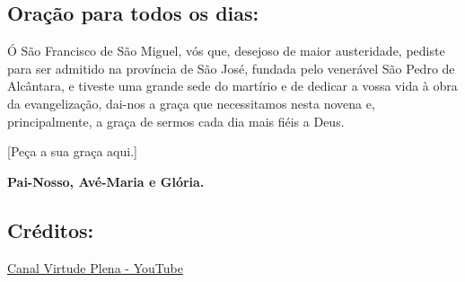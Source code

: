 \documentclass[11pt]{article}
\begin{document}
\subsection{Oração para todos os dias:} \label{oracao-canonizacao}

Ó São Francisco de São Miguel, vós que, desejoso de maior austeridade, pediste para ser admitido na província de São José, fundada pelo venerável São Pedro de Alcântara, e tiveste uma grande sede do martírio e de dedicar a vossa vida à obra da evangelização, dai-nos a graça que necessitamos nesta novena e, principalmente, a graça de sermos cada dia mais fiéis a Deus.

[Peça a sua graça aqui.]

\textbf{Pai-Nosso, Avé-Maria e Glória.}

\subsection*{Créditos:}
\href{https://www.youtube.com/watch?v=5uurRmRqG_U&list=PLRL6i6PPLb59lYAov5lt4llBN4eevfdkR}{Canal Virtude Plena - YouTube}
\end{document}
